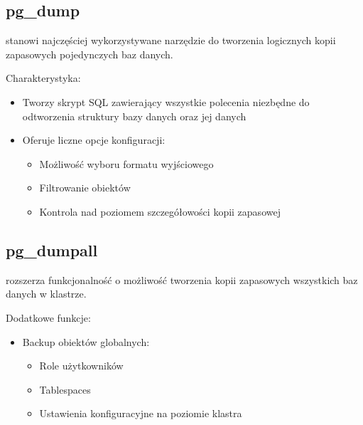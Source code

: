 \documentclass[letterpaper,10pt,polish]{sphinxmanual}
\begin{document}
\subsection{pg\_dump}
\label{\detokenize{kopie_zapasowe_i_odzyskiwanie_danych:pg-dump}}
\sphinxAtStartPar
{} stanowi najczęściej wykorzystywane narzędzie do tworzenia logicznych kopii zapasowych pojedynczych baz danych.

\sphinxAtStartPar
Charakterystyka:
\begin{itemize}
\item {} 
\sphinxAtStartPar
Tworzy skrypt SQL zawierający wszystkie polecenia niezbędne do odtworzenia struktury bazy danych oraz jej danych

\item {} 
\sphinxAtStartPar
Oferuje liczne opcje konfiguracji:
\begin{itemize}
\item {} 
\sphinxAtStartPar
Możliwość wyboru formatu wyjściowego

\item {} 
\sphinxAtStartPar
Filtrowanie obiektów

\item {} 
\sphinxAtStartPar
Kontrola nad poziomem szczegółowości kopii zapasowej

\end{itemize}

\end{itemize}


\subsection{pg\_dumpall}
\label{\detokenize{kopie_zapasowe_i_odzyskiwanie_danych:pg-dumpall}}
\sphinxAtStartPar
{} rozszerza funkcjonalność  o możliwość tworzenia kopii zapasowych wszystkich baz danych w klastrze.

\sphinxAtStartPar
Dodatkowe funkcje:
\begin{itemize}
\item {} 
\sphinxAtStartPar
Backup obiektów globalnych:
\begin{itemize}
\item {} 
\sphinxAtStartPar
Role użytkowników

\item {} 
\sphinxAtStartPar
Tablespaces

\item {} 
\sphinxAtStartPar
Ustawienia konfiguracyjne na poziomie klastra

\end{itemize}

\end{itemize}
\end{document}
